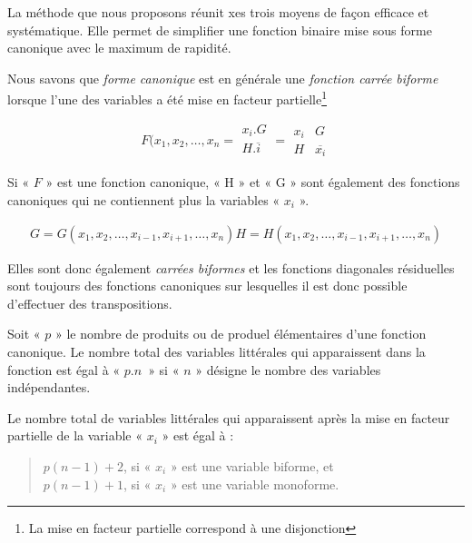 La méthode que nous proposons réunit xes trois moyens de façon efficace et systématique. Elle permet de simplifier une fonction binaire mise sous forme canonique avec le maximum de rapidité. 

Nous savons que \emph{forme canonique} est en générale une \emph{fonction carrée biforme}  lorsque l'une des variables a été mise en facteur partielle\footnote{La mise en facteur partielle correspond à une disjonction} 


 
  \[ F (x_1, x_2,\ldots , x_n = 
  \begin{array}{|c|}  x_i . G \\ H . \overline{i} \\ \end{array}
     = \begin{array}{|c|c|} x_i & G \\ H & \overline{x_i} \end{array} 
  \]
  

  
Si « $F$ » est une fonction canonique, « H » et « G » sont également des fonctions canoniques qui ne  contiennent plus la variables « $x_i$ ». 


    
    \[
    \begin{array}{|c} 
    		G = G (x_1, x_2, \ldots, x_{i-1}, x_{i+1}, \ldots, x_n) 
    		H = H (x_1, x_2, \ldots, x_{i-1}, x_{i+1}, \ldots, x_n) 
    \end{array}
    \]
    

    
Elles sont donc également \emph{carrées biformes} et les fonctions diagonales résiduelles sont toujours des fonctions canoniques sur lesquelles il est donc possible d'effectuer des transpositions.    

Soit « $p$ » le nombre de produits ou de produel élémentaires d'une fonction canonique. Le nombre total des variables littérales qui apparaissent dans la fonction est égal à « $p . n$~» si « $n$ » désigne le nombre des variables indépendantes. 

Le nombre total de variables littérales qui apparaissent après la mise en facteur partielle de la variable « $x_i$ » est égal à : 

\begin{quote}
$p(n-1) +2$, si « $x_i$ » est une variable biforme, et \\
$p(n-1) +1$, si « $x_i$ » est une variable monoforme.
\end{quote}

